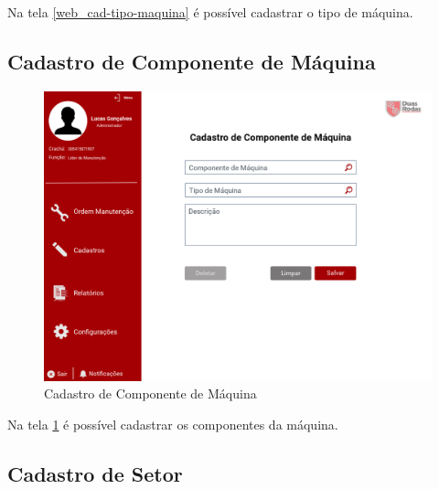 Na tela \ref{web_cad-tipo-maquina} é possível cadastrar o tipo de máquina.

\newpage
\subsection{Cadastro de Componente de Máquina}

\begin{figure}[htb]
	\caption{\label{web_cad-componente-maquina}Cadastro de Componente de Máquina}
	\begin{center}
		\includegraphics[scale=0.55]{./Figuras/web/cad-componente-maquina.png}
	\end{center}
\end{figure}

Na tela \ref{web_cad-componente-maquina} é possível cadastrar os componentes da máquina.

\newpage
\subsection{Cadastro de Setor}

